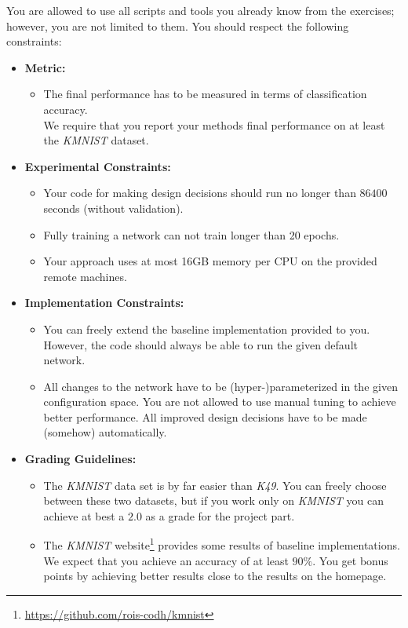 \documentclass[10pt,a4paper]{article}
\begin{document}
		You are allowed to use all scripts and tools you already know from the exercises; however, you are not limited to them.
		\newpage\noindent
		You should respect the following constraints:
		\begin{itemize}
			\item \textbf{Metric:}
			\begin{itemize}
				\item The final performance has to be measured in terms of classification accuracy.\\
					We require that you report your methods final performance on at least the \textit{KMNIST} dataset.
			\end{itemize}
			\item \textbf{Experimental Constraints:}
			\begin{itemize}
				\item Your code for making design decisions should run no longer than $86400$ seconds (without validation).
				\item Fully training a network can not train longer than 20 epochs.
				\item Your approach uses at most 16GB memory per CPU on the provided remote machines.
			\end{itemize}
			\item \textbf{Implementation Constraints:}
			\begin{itemize}
			  \item You can freely extend the baseline implementation provided to you. However, the code should always be able to run the given default network.
			  \item All changes to the network have to be (hyper-)parameterized in the given configuration space. You are not allowed to use manual tuning to achieve better performance. All improved design decisions have to be made (somehow) automatically.
			\end{itemize}
			\item \textbf{Grading Guidelines:}
			\begin{itemize}
			  \item The \textit{KMNIST} data set is by far easier than \textit{K49}. You can freely choose between these two datasets, but if you work only on \textit{KMNIST} you can achieve at best a $2.0$ as a grade for the project part.
			  \item The \textit{KMNIST} website\footnote{\url{https://github.com/rois-codh/kmnist}} provides some results of baseline implementations. We expect that you achieve an accuracy of at least $90\%$. You get bonus points by achieving better results close to the results on the homepage.
			\end{itemize}
		\end{itemize}
		
\end{document}
